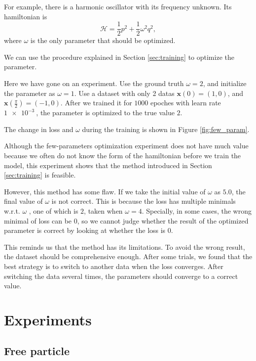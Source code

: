 \documentclass{article}
\begin{document}
For example, there is a harmonic oscillator with its frequency unknown.
Its hamiltonian is
\begin{equation}
	\mathcal H=\frac12p^2+\frac12\omega^2q^2,
\end{equation}
where $\omega$ is the only parameter that should be optimized.

We can use the procedure explained in Section \ref{sec:training}
to optimize the parameter.

Here we have gone on an experiment.
Use the ground truth $\omega=2$, and initialize the parameter as $\omega=1$.
Use a dataset with only 2 datas $\mathbf x\left(0\right)=\left(1,0\right)$,
and $\mathbf x\left(\frac\pi2\right)=\left(-1,0\right)$.
After we trained it for $1000$ epoches with learn rate $\SI{1e-3}{}$,
the parameter is optimized to the true value $2$.

The change in loss and $\omega$ during the training is shown in Figure \ref{fig:few_param}.

Although the few-parameters optimization experiment does not have much value
because we often do not know the form of the hamiltonian before we train the model,
this experiment shows that the method introduced in Section \ref{sec:training} is feasible.

However, this method has some flaw. If we take the initial value of $\omega$ as $5.0$,
the final value of $\omega$ is not correct.
This is because the loss has multiple minimals w.r.t. $\omega$ \cite[p. 121]{reed1999smithing},
one of which is $2$, taken when $\omega=4$.
Specially, in some cases, the wrong minimal of loss can be $0$,
so we cannot judge whether the result of the optimized parameter is correct
by looking at whether the loss is $0$.

This reminds us that the method has its limitations.
To avoid the wrong result, the dataset should be comprehensive enough.
After some trials, we found that the best strategy is to switch to another data
when the loss converges.
After switching the data several times,
the parameters should converge to a correct value.

\section{Experiments}
\label{sec:experiments}

\subsection{Free particle}
\end{document}
